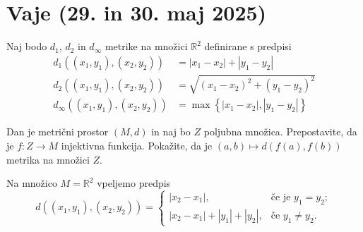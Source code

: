 \documentclass[11pt,a4paper]{exam}
\renewcommand{\{}{\lbrace}
\renewcommand{\}}{\rbrace}
\begin{document}
\section*{Vaje (29. in 30. maj 2025)}
\begin{questions}
	\question Naj bodo $d_{1}$, $d_{2}$ in $d_{\infty}$ metrike na množici $\mathbb{R}^{2}$ definirane s predpisi
		\begin{align*}
			d_{1}\left( (x_{1}, y_{1}), (x_{2}, y_{2}) \right) &= |x_{1} - x_{2}| + |y_{1} - y_{2}| \\
			d_{2}\left( (x_{1}, y_{1}), (x_{2}, y_{2}) \right) &= \sqrt{(x_{1} - x_{2})^{2} + (y_{1} - y_{2})^{2}} \\
			d_{\infty}\left( (x_{1}, y_{1}), (x_{2}, y_{2}) \right) &= \max\left\{ |x_{1} - x_{2}|, |y_{1} - y_{2}| \right\}
		\end{align*}

	\question Dan je metrični prostor $(M,d)$ in naj bo $Z$ poljubna množica. Prepostavite, da je $f \colon Z \to M$ injektivna funkcija. Pokažite, da je $(a,b) \mapsto d(f(a), f(b))$ metrika na množici $Z$.


	\question Na množico $M = \mathbb{R}^{2}$ vpeljemo predpis 
		\[d\left( (x_{1}, y_{1}), (x_{2}, y_{2}) \right)=
		\begin{cases}
			|x_{2} - x_{1}|, &\text{če je } y_{1} = y_{2}; \\
			|x_{2} - x_{1}| + |y_{1}| + |y_{2}|, & \text{če } y_{1} \neq y_{2}.
		\end{cases}
		\]
		\begin{parts}

\end{parts}
\end{questions}
\end{document}
